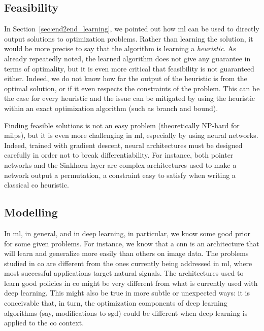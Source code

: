 \documentclass[11pt]{article}
\begin{document}
	\subsection{Feasibility}
		\label{sec:feasibility}
		In Section~\ref{sec:end2end_learning}, we pointed out how \gls{ml} can be used to directly output
		solutions to optimization problems.
		Rather than learning the solution, it would be more precise to say that the algorithm is learning a
		\textit{heuristic}.
		As already repeatedly noted, the learned algorithm does not give any guarantee in terms of
		optimality, but it is even more critical that feasibility is not guaranteed either.
		Indeed, we do not know how far the output of the heuristic is from the optimal solution, or if it
		even respects the constraints of the problem.
		This can be the case for every heuristic and the issue can be mitigated by using the heuristic
		within an exact optimization algorithm (such as branch and bound).

		Finding feasible solutions is not an easy problem (theoretically NP-hard for \glspl{milp}), but it
		is even more challenging in \gls{ml}, especially by using neural networks.
		Indeed, trained with gradient descent, neural architectures must be designed carefully in order not
		to break differentiability.
		For instance, both pointer networks \citep{VinyalsPointerNetworks2015} and the Sinkhorn layer
		\citep{EmamiLearningPermutationsSinkhorn2018} are complex architectures used to make a network
		output a permutation, a constraint easy to satisfy when writing a classical \gls{co} heuristic.

	\subsection{Modelling}
		\label{sec:modelling}
		In \gls{ml}, in general, and in deep learning, in particular, we know some good prior for some
		given problems.
		For instance, we know that a \gls{cnn} is an architecture that will learn and generalize more
		easily than others on image data.
		The problems studied in \gls{co} are different from the ones currently being addressed in \gls{ml},
		where most successful applications target natural signals.
		The architectures used to learn good policies in \acrlong{co} might be very different from what is
		currently used with deep learning.
		This might also be true in more subtle or unexpected ways: it is conceivable that, in turn, the
		optimization components of deep learning algorithms (say, modifications to \gls{sgd}) could be
		different when deep learning is applied to the \gls{co} context.
\end{document}
